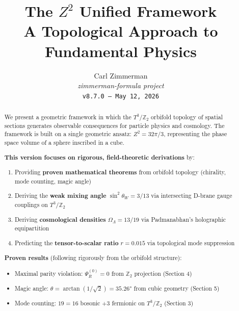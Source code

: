 \documentclass[12pt,a4paper]{article}
\newcommand{\Ztwo}{\mathbb{Z}_2}
\newcommand{\Tthree}{T^3}
\newcommand{\OmegaL}{\Omega_\Lambda}
\newcommand{\sinW}{\sin^2\theta_W}
\newcommand{\Zsq}{Z^2}
\begin{document}
\title{\textbf{The $Z^2$ Unified Framework}\\[0.5em]
\large A Topological Approach to Fundamental Physics}

\author{Carl Zimmerman\\[0.5em]
\small\textit{zimmerman-formula project}\\
\small\texttt{v8.7.0 --- May 12, 2026}}

\date{}

\maketitle

\begin{abstract}

We present a geometric framework in which the $\Tthree/\Ztwo$ orbifold topology of spatial sections generates observable consequences for particle physics and cosmology. The framework is built on a single geometric ansatz: $\Zsq = 32\pi/3$, representing the phase space volume of a sphere inscribed in a cube.

\textbf{This version focuses on rigorous, field-theoretic derivations} by:
\begin{enumerate}[itemsep=0pt]
    \item Providing \textbf{proven mathematical theorems} from orbifold topology (chirality, mode counting, magic angle)
    \item Deriving the \textbf{weak mixing angle} $\sinW = 3/13$ via intersecting D-brane gauge couplings on $\Tthree/\Ztwo$
    \item Deriving \textbf{cosmological densities} $\OmegaL = 13/19$ via Padmanabhan's holographic equipartition
    \item Predicting the \textbf{tensor-to-scalar ratio} $r = 0.015$ via topological mode suppression
\end{enumerate}

\textbf{Proven results} (following rigorously from the orbifold structure):
\begin{itemize}[itemsep=0pt]
    \item Maximal parity violation: $\Psi_R^{(0)} = 0$ from $\Ztwo$ projection (Section 4)
    \item Magic angle: $\theta = \arctan(1/\sqrt{2}) = 35.26°$ from cubic geometry (Section 5)
    \item Mode counting: $19 = 16$ bosonic $+ 3$ fermionic on $\Tthree/\Ztwo$ (Section 3)
\end{itemize}


\end{abstract}
\end{document}

